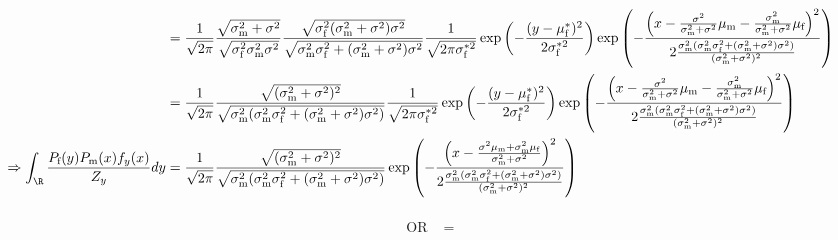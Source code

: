 \documentclass{article}\usepackage[]{graphicx}\usepackage[]{color}
\newcommand{\x}[1]{\text{#1}}
\begin{document}
\begin{landscape}
\begin{align*}
\\&=\frac{1}{\sqrt{2\pi}}\frac{\sqrt{\sigma_\x{m}^2+\sigma^2}}{\sqrt{\sigma_\x{f}^2\sigma_\x{m}^2\sigma^2}}\frac{\sqrt{\sigma_\x{f}^2(\sigma_\x{m}^2+\sigma^2)\sigma^2}}{\sqrt{\sigma_\x{m}^2\sigma_\x{f}^2+(\sigma_\x{m}^2+\sigma^2)\sigma^2}}\frac{1}{\sqrt{2\pi\sigma_\x{f}^{*2}}}\exp\left(-\frac{(y-\mu_\x{f}^*)^2}{2\sigma_\x{f}^{*2}}\right)\exp\left(-\frac{\left(x-\frac{\sigma^2}{\sigma_\x{m}^2+\sigma^2}\mu_\x{m}-\frac{\sigma_\x{m}^2}{\sigma_\x{m}^2+\sigma^2}\mu_\x{f}\right)^2}{2\frac{\sigma_\x{m}^2(\sigma_\x{m}^2\sigma_\x{f}^2+(\sigma_\x{m}^2+\sigma^2)\sigma^2)}{(\sigma_\x{m}^2+\sigma^2)^2}}\right)
\\&=\frac{1}{\sqrt{2\pi}}\frac{\sqrt{(\sigma_\x{m}^2+\sigma^2)^2}}{\sqrt{\sigma_\x{m}^2(\sigma_\x{m}^2\sigma_\x{f}^2+(\sigma_\x{m}^2+\sigma^2)\sigma^2)}}\frac{1}{\sqrt{2\pi\sigma_\x{f}^{*2}}}\exp\left(-\frac{(y-\mu_\x{f}^*)^2}{2\sigma_\x{f}^{*2}}\right)\exp\left(-\frac{\left(x-\frac{\sigma^2}{\sigma_\x{m}^2+\sigma^2}\mu_\x{m}-\frac{\sigma_\x{m}^2}{\sigma_\x{m}^2+\sigma^2}\mu_\x{f}\right)^2}{2\frac{\sigma_\x{m}^2(\sigma_\x{m}^2\sigma_\x{f}^2+(\sigma_\x{m}^2+\sigma^2)\sigma^2)}{(\sigma_\x{m}^2+\sigma^2)^2}}\right)
\\ \Rightarrow \int_\R \frac{P_\x{f}(y)P_\x{m}(x)f_y(x)}{Z_y}dy&=\frac{1}{\sqrt{2\pi}}\frac{\sqrt{(\sigma_\x{m}^2+\sigma^2)^2}}{\sqrt{\sigma_\x{m}^2(\sigma_\x{m}^2\sigma_\x{f}^2+(\sigma_\x{m}^2+\sigma^2)\sigma^2)}}\exp\left(-\frac{\left(x-\frac{\sigma^2\mu_\x{m}+\sigma_\x{m}^2\mu_\x{f}}{\sigma_\x{m}^2+\sigma^2}\right)^2}{2\frac{\sigma_\x{m}^2(\sigma_\x{m}^2\sigma_\x{f}^2+(\sigma_\x{m}^2+\sigma^2)\sigma^2)}{(\sigma_\x{m}^2+\sigma^2)^2}}\right)
\end{align*}
\end{landscape}
\begin{align*}
\\ \text{ OR } &=
\end{align*}
\end{document}
